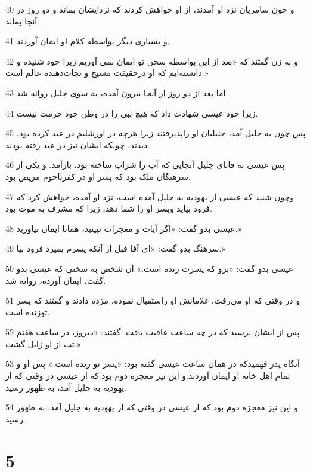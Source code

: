\par 40 و چون سامریان نزد او آمدند، از او خواهش کردند که نزدایشان بماند و دو روز در آنجا بماند.
\par 41 و بسیاری دیگر بواسطه کلام او ایمان آوردند.
\par 42 و به زن گفتند که «بعد از این بواسطه سخن تو ایمان نمی آوریم زیرا خود شنیده و دانسته‌ایم که او درحقیقت مسیح و نجات‌دهنده عالم است.»
\par 43 اما بعد از دو روز از آنجا بیرون آمده، به سوی جلیل روانه شد.
\par 44 زیرا خود عیسی شهادت داد که هیچ نبی را در وطن خود حرمت نیست.
\par 45 پس چون به جلیل آمد، جلیلیان او راپذیرفتند زیرا هر‌چه در اورشلیم در عید کرده بود، دیدند، چونکه ایشان نیز در عید رفته بودند.
\par 46 پس عیسی به قانای جلیل آنجایی که آب را شراب ساخته بود، بازآمد. و یکی از سرهنگان ملک بود که پسر او در کفرناحوم مریض بود.
\par 47 وچون شنید که عیسی از یهودیه به جلیل آمده است، نزد او آمده، خواهش کرد که فرود بیاید وپسر او را شفا دهد، زیرا که مشرف به موت بود.
\par 48 عیسی بدو گفت: «اگر آیات و معجزات نبینید، همانا ایمان نیاورید.»
\par 49 سرهنگ بدو گفت: «ای آقا قبل از آنکه پسرم بمیرد فرود بیا.»
\par 50 عیسی بدو گفت: «برو که پسرت زنده است.» آن شخص به سخنی که عیسی بدو گفت، ایمان آورده، روانه شد.
\par 51 و در وقتی که او می‌رفت، غلامانش او راستقبال نموده، مژده دادند و گفتند که پسر توزنده است.
\par 52 پس از ایشان پرسید که در چه ساعت عافیت یافت. گفتند: «دیروز، در ساعت هفتم تب از او زایل گشت.»
\par 53 آنگاه پدر فهمیدکه در همان ساعت عیسی گفته بود: «پسر تو زنده است.» پس او و تمام اهل خانه او ایمان آوردند.و این نیز معجزه دوم بود که از عیسی در وقتی که از یهودیه به جلیل آمد، به ظهور رسید.
\par 54 و این نیز معجزه دوم بود که از عیسی در وقتی که از یهودیه به جلیل آمد، به ظهور رسید.

\chapter{5}

